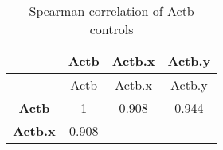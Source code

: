 \documentclass[]{article}
\begin{document}
\begin{longtable}[c]{@{}cccc@{}}
\caption{Spearman correlation of Actb controls}\tabularnewline
\toprule
\begin{minipage}[b]{0.16\columnwidth}\centering\strut
~
\strut\end{minipage} &
\begin{minipage}[b]{0.09\columnwidth}\centering\strut
Actb
\strut\end{minipage} &
\begin{minipage}[b]{0.11\columnwidth}\centering\strut
Actb.x
\strut\end{minipage} &
\begin{minipage}[b]{0.11\columnwidth}\centering\strut
Actb.y
\strut\end{minipage}\tabularnewline
\midrule
\endfirsthead
\toprule
\begin{minipage}[b]{0.16\columnwidth}\centering\strut
~
\strut\end{minipage} &
\begin{minipage}[b]{0.09\columnwidth}\centering\strut
Actb
\strut\end{minipage} &
\begin{minipage}[b]{0.11\columnwidth}\centering\strut
Actb.x
\strut\end{minipage} &
\begin{minipage}[b]{0.11\columnwidth}\centering\strut
Actb.y
\strut\end{minipage}\tabularnewline
\midrule
\endhead
\begin{minipage}[t]{0.16\columnwidth}\centering\strut
\textbf{Actb}
\strut\end{minipage} &
\begin{minipage}[t]{0.09\columnwidth}\centering\strut
1
\strut\end{minipage} &
\begin{minipage}[t]{0.11\columnwidth}\centering\strut
0.908
\strut\end{minipage} &
\begin{minipage}[t]{0.11\columnwidth}\centering\strut
0.944
\strut\end{minipage}\tabularnewline
\begin{minipage}[t]{0.16\columnwidth}\centering\strut
\textbf{Actb.x}
\strut\end{minipage} &
\begin{minipage}[t]{0.09\columnwidth}\centering\strut
0.908
\strut\end{minipage} &
\begin{minipage}[t]{0.11\columnwidth}\centering\strut

\end{minipage}
\end{longtable}
\end{document}

